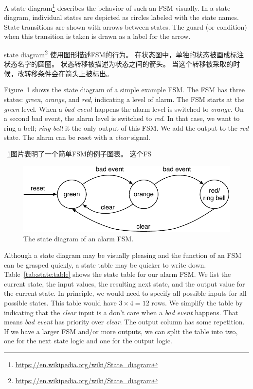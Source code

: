 \documentclass[%
    10pt,
    headinclude, footexclude,
    openright, %
    notitlepage,
    cleardoubleempty,
    headsepline,
    pointlessnumbers,
    bibtotoc, idxtotoc,
    ]{scrbook}
\newcommand{\scale}{0.7}
\newcommand{\myref}[2]{\href{#1}{#2}}
\renewcommand{\myref}[2]{{#2}{\footnote{\url{#1}}}}
\begin{document}
A \myref{https://en.wikipedia.org/wiki/State_diagram}{state diagram}
describes the behavior of such an FSM visually.
In a state diagram, individual states are depicted as circles labeled
with the state names.
State transitions are shown with arrows between states.
The guard (or condition) when this transition is taken is drawn as a label
for the arrow.

\myref{https://en.wikipedia.org/wiki/State_diagram}{state diagram}
使用图形描述FSM的行为。
在状态图中，单独的状态被画成标注状态名字的圆圈。
状态转移被描述为状态之间的箭头。
当这个转移被采取的时候，改转移条件会在箭头上被标出。

Figure~\ref{fig:diag-moore} shows the state diagram of a simple example FSM.
The FSM has three states: \emph{green}, \emph{orange}, and \emph{red},
indicating a level of alarm. The FSM starts at the \emph{green} level.
When a \emph{bad event} happens the alarm level is switched to \emph{orange}.
On a second bad event, the alarm level is switched to \emph{red}.
In that case, we want to ring a bell; \emph{ring bell} it the only output of this FSM.
We add the output to the \emph{red} state.
The alarm can be reset with a \emph{clear} signal.

~\ref{fig:diag-moore}图片表明了一个简单FSM的例子图表。
这个FS

\begin{figure}
  \centering
  \includegraphics[scale=\scale]{figures/state-diag-moore}
  \caption{The state diagram of an alarm FSM.}
  \label{fig:diag-moore}
\end{figure}

Although a state diagram may be visually pleasing and the function of an FSM
can be grasped quickly, a state table may be quicker to write down.
Table~\ref{tab:state:table} shows the state table for our alarm FSM.
We list the current state, the input values, the resulting next state, and
the output value for the current state. In principle, we would need to
specify all possible inputs for all possible states. This table would have
$3 \times 4 = 12$ rows. We simplify the table by indicating that the \emph{clear}
input is a don't care when a \emph{bad event} happens. That means
\emph{bad event} has priority over \emph{clear}. The output column
has some repetition. If we have a larger FSM and/or more outputs, we
can split the table into two, one for the next state logic and one for the
output logic.
\end{document}
